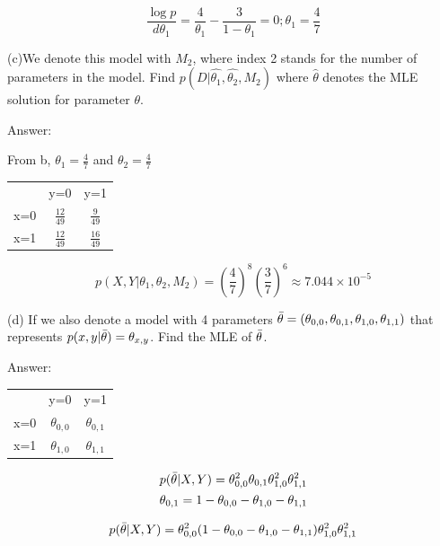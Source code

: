 \documentclass{article}
\begin{document}
\begin{equation}
    \frac{\log p}{d \theta_{1}} = \frac{4}{\theta_{1}}-\frac{3}{1-\theta_{1}} = 0; \theta_{1}= \frac{4}{7}
\end{equation}

(c)We denote this model with $M_2$, where index 2 stands for the number of parameters in the model. Find $p(D|\hat{\theta_{1}},\hat{\theta_{2}},M_2)$ where $\hat{\theta}$ denotes the MLE solution for parameter $\theta$.

Answer:

From b, $\theta_{1}= \frac{4}{7}$ and $\theta_{2}= \frac{4}{7}$
\begin{center}
\begin{tabular}{ c c c }
   & y=0 & y=1 \\ 
x=0 & $\frac{12}{49}$ & $\frac{9}{49}$ \\  
x=1 & $\frac{12}{49}$ & $\frac{16}{49}$  
\end{tabular}
\end{center}

\begin{equation}
    p(X,Y|\theta_{1},\theta_{2},M_{2})= (\frac{4}{7})^{8}(\frac{3}{7})^{6} \approx 7.044 \times 10^{-5}
\end{equation}

(d) If we also denote a model with 4 parameters $\Bar{\theta} = (\theta_{0,0},\theta_{0,1},\theta_{1,0},\theta_{1,1})$ that represents $p(x,y|\Bar{\theta}) = \theta_{x,y}$. Find the MLE of $\Bar{\theta}$.

Answer:

\begin{center}
\begin{tabular}{ c c c }
   & y=0 & y=1 \\ 
x=0 & $\theta_{0,0}$ & $\theta_{0,1}$ \\  
x=1 & $\theta_{1,0}$ & $\theta_{1,1}$  
\end{tabular}
\end{center}

\begin{equation}
\begin{aligned}
    &p(\Bar{\theta}|X,Y) = \theta_{0,0}^{2} \theta_{0,1} \theta_{1,0}^{2} \theta_{1,1}^{2}\\ 
    &\theta_{0,1} = 1- \theta_{0,0}-\theta_{1,0}-\theta_{1,1}
\end{aligned}
\end{equation}

\begin{equation}
\begin{aligned}
    p(\Bar{\theta}|X,Y) = \theta_{0,0}^{2} (1- \theta_{0,0}-\theta_{1,0}-\theta_{1,1}) \theta_{1,0}^{2} \theta_{1,1}^{2}
\end{aligned}
\end{equation}
\end{document}
